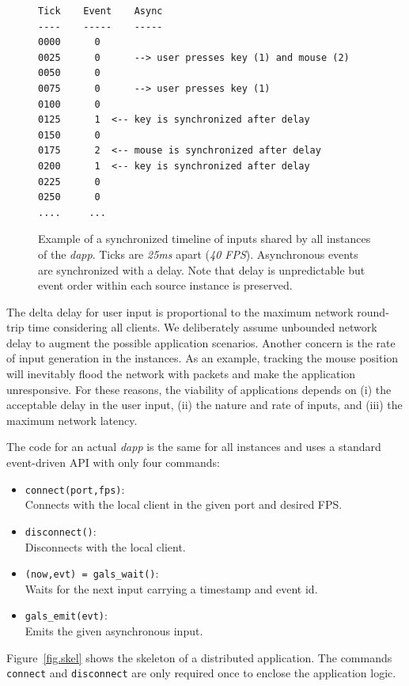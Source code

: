 \documentclass[sigplan,screen]{acmart}
\newcommand{\dapp}{\emph{dapp}\xspace}
\begin{document}
\begin{figure}[t]
{\scriptsize
\begin{verbatim}
Tick    Event    Async
----    -----    -----
0000      0
0025      0      --> user presses key (1) and mouse (2)
0050      0
0075      0      --> user presses key (1)
0100      0
0125      1  <-- key is synchronized after delay
0150      0
0175      2  <-- mouse is synchronized after delay
0200      1  <-- key is synchronized after delay
0225      0
0250      0
....     ...
\end{verbatim}
}
  \caption{
    \label{fig.timeline}
    Example of a synchronized timeline of inputs shared by all instances of the
    \dapp.
    Ticks are \emph{25ms} apart (\emph{40 FPS}).
    Asynchronous events are synchronized with a delay.
    Note that delay is unpredictable but event order within each source
    instance is preserved.
  }
\end{figure}

The delta delay for user input is proportional to the maximum network
round-trip time considering all clients.
We deliberately assume unbounded network delay to augment the possible
application scenarios.
Another concern is the rate of input generation in the instances.
As an example, tracking the mouse position will inevitably flood the network
with packets and make the application unresponsive.
For these reasons, the viability of applications depends on
    (i) the acceptable delay in the user input,
    (ii) the nature and rate of inputs, and
    (iii) the maximum network latency.

The code for an actual \dapp is the same for all instances and uses a standard
event-driven API with only four commands:
%
\begin{itemize}
\item \texttt{connect(port,fps)}:        \\Connects with the local client in the given port and desired FPS.
\item \texttt{disconnect()}:             \\Disconnects with the local client.
\item \texttt{(now,evt) = gals\_wait()}: \\Waits for the next input carrying a timestamp and event id.
\item \texttt{gals\_emit(evt)}:          \\Emits the given asynchronous input.
\end{itemize}
%
Figure~\ref{fig.skel} shows the skeleton of a distributed application.
The commands \texttt{connect} and \texttt{disconnect} are only required once to
enclose the application logic.
\end{document}
